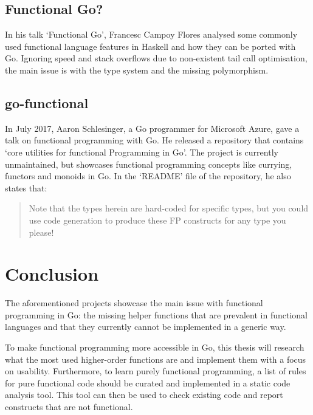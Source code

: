 \subsection{Functional Go?}

In his talk `Functional Go'\autocite{func-go-talk}, Francesc Campoy Flores analysed some commonly used functional
language features in Haskell and how they can be ported with Go. Ignoring speed and stack overflows due to non-existent
tail call optimisation\autocite{go-tco}, the main issue is with the type system and the missing polymorphism.

\subsection{go-functional}

In July 2017, Aaron Schlesinger, a Go programmer for Microsoft Azure, gave a talk on functional programming with Go.
He released a repository\autocite{go-functional} that contains `core utilities for functional Programming in Go'.
The project is currently unmaintained, but showcases functional programming concepts like currying, functors and
monoids in Go. In the `README' file of the repository, he also states that:
\begin{quote}
    Note that the types herein are hard-coded for specific types, but you could
    use code generation to produce these FP constructs for any type you please!
    \autocite{go-functional-readme}
\end{quote}

\section{Conclusion}

The aforementioned projects showcase the main issue with functional programming in Go: the missing
helper functions that are prevalent in functional languages and that they currently cannot be implemented
in a generic way.

To make functional programming more accessible in Go, this thesis will research what the most used
higher-order functions are and implement them with a focus on usability.
Furthermore, to learn purely functional programming, a list of rules for pure functional code should
be curated and implemented in a static code analysis tool. This tool can then be used to check
existing code and report constructs that are not functional.
